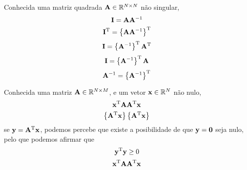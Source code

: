 \begin{myproofT}\label{proof:theo:simetricmatrix4}
Conhecida uma matriz quadrada $\MATRIX{A} \in \mathbb{R}^{N \times N}$ não singular, 
\begin{equation}
\MATRIX{I}=\MATRIX{A}\MATRIX{A}^{-1}
\end{equation}
\begin{equation}
\MATRIX{I}^{\transpose}=\left\{\MATRIX{A}\MATRIX{A}^{-1}\right\}^{\transpose}
\end{equation}
\begin{equation}
\MATRIX{I}=\left\{\MATRIX{A}^{-1}\right\}^{\transpose} \MATRIX{A}^{\transpose}
\end{equation}
\begin{equation}
\MATRIX{I}=\left\{\MATRIX{A}^{-1}\right\}^{\transpose} \MATRIX{A}
\end{equation}
\begin{equation}
\MATRIX{A}^{-1}=\left\{\MATRIX{A}^{-1}\right\}^{\transpose} 
\end{equation}
\end{myproofT}


\begin{myproofT}\label{proof:theo:semipositivematrix1}
Conhecida uma matriz $\MATRIX{A} \in \mathbb{R}^{N \times M}$,
e um vetor $\VECTOR{x} \in \mathbb{R}^{N}$ não nulo,
\begin{equation}
\VECTOR{x}^{\transpose}\MATRIX{A}\MATRIX{A}^{\transpose}\VECTOR{x}
\end{equation}
\begin{equation}
\left\{\MATRIX{A}^{\transpose}\VECTOR{x}\right\}\left\{\MATRIX{A}^{\transpose}\VECTOR{x}\right\}
\end{equation}
se $\VECTOR{y}=\MATRIX{A}^{\transpose}\VECTOR{x}$, 
podemos percebe que existe a posibilidade de que $\VECTOR{y}=\VECTOR{0}$ seja nulo,
pelo que podemos afirmar que 
\begin{equation}
\VECTOR{y}^{\transpose}\VECTOR{y}\geq 0
\end{equation}
\begin{equation}
\VECTOR{x}^{\transpose}\MATRIX{A}\MATRIX{A}^{\transpose}\VECTOR{x}
\end{equation}
\end{myproofT}

